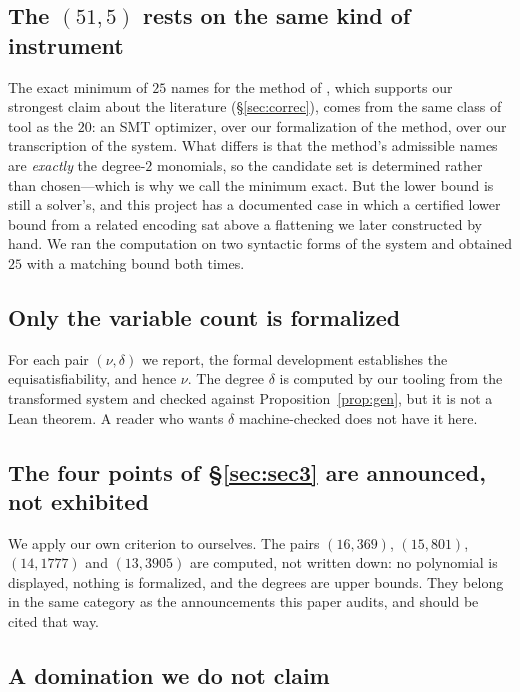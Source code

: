\subsection{The $(51,5)$ rests on the same kind of instrument}

The exact minimum of $25$ names for the method of \cite{davis1973}, which
supports our strongest claim about the literature (\S\ref{sec:correc}), comes
from the same class of tool as the $20$: an SMT optimizer, over our
formalization of the method, over our transcription of the system. What differs
is that the method's admissible names are \emph{exactly} the degree-$2$
monomials, so the candidate set is determined rather than chosen---which is why
we call the minimum exact. But the lower bound is still a solver's, and this
project has a documented case in which a certified lower bound from a related
encoding sat above a flattening we later constructed by hand. We ran the
computation on two syntactic forms of the system and obtained $25$ with a
matching bound both times.

\subsection{Only the variable count is formalized}

For each pair $(\nu,\delta)$ we report, the formal development establishes the
equisatisfiability, and hence $\nu$. The degree $\delta$ is computed by our
tooling from the transformed system and checked against
Proposition~\ref{prop:gen}, but it is not a Lean theorem. A reader who wants
$\delta$ machine-checked does not have it here.

\subsection{The four points of \texorpdfstring{\S\ref{sec:sec3}}{Section 6} are announced, not exhibited}

We apply our own criterion to ourselves. The pairs $(16,369)$, $(15,801)$,
$(14,1777)$ and $(13,3905)$ are computed, not written down: no polynomial is
displayed, nothing is formalized, and the degrees are upper bounds. They belong
in the same category as the announcements this paper audits, and should be cited
that way.

\subsection{A domination we do not claim}

